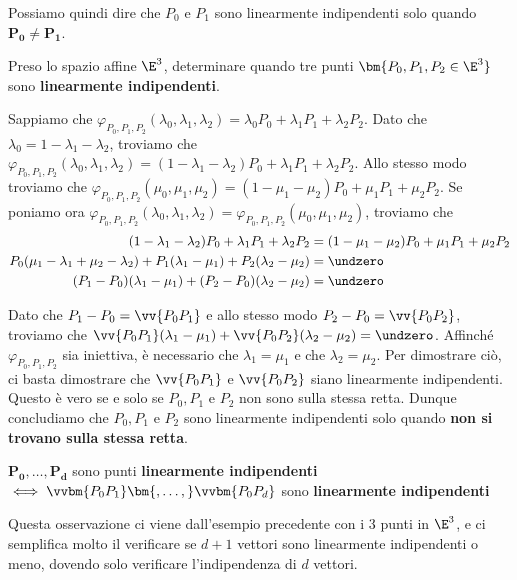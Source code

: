 \documentclass[11pt, a4paper, titlepage, oneside]{scrbook}
\begin{document}
Possiamo quindi dire che $P_0$ e $P_1$ sono linearmente indipendenti solo quando $\bm{P_0 \neq P_1}$.

\Separatore

Preso lo spazio affine $\E^3$, determinare quando tre punti $\bm{P_0,P_1,P_2 \in \E^3}$ sono \textbf{linearmente indipendenti}. \nopagebreak

Sappiamo che $\varphi_{P_0,P_1,P_2}(\lambda_0,\lambda_1,\lambda_2) = \lambda_0 P_0 + \lambda_1 P_1 + \lambda_2 P_2$. Dato che $\lambda_0 = 1 - \lambda_1 - \lambda_2$, troviamo che $\varphi_{P_0,P_1,P_2}(\lambda_0,\lambda_1,\lambda_2) = (1-\lambda_1-\lambda_2)P_0 + \lambda_1 P_1 + \lambda_2 P_2$. Allo stesso modo troviamo che $\varphi_{P_0,P_1,P_2}(\mu_0,\mu_1,\mu_2) = (1-\mu_1-\mu_2) P_0 + \mu_1 P_1 + \mu_2 P_2$. Se poniamo ora $\varphi_{P_0,P_1,P_2}(\lambda_0,\lambda_1,\lambda_2) = \varphi_{P_0,P_1,P_2}(\mu_0,\mu_1,\mu_2)$, troviamo che 
\begin{align*}
(1-\lambda_1 - \lambda_2)P_0 + \lambda_1 P_1 + \lambda_2 P_2 &= (1-\mu_1-\mu_2) P_0 + \mu_1 P_1 + \mu_2 P_2 \\
P_0(\mu_1 - \lambda_1 + \mu_2 - \lambda_2) + P_1(\lambda_1 - \mu_1) + P_2(\lambda_2 - \mu_2) &= \undzero \\
(P_1 - P_0)(\lambda_1 - \mu_1) + (P_2 - P_0)(\lambda_2 - \mu_2) &= \undzero 
\end{align*}

Dato che $P_1 - P_0 = \vv{P_0P_1}$ e allo stesso modo $P_2 - P_0 = \vv{P_0P_2}$, troviamo che \mbox{$\vv{P_0P_1}(\lambda_1 - \mu_1) + \vv{P_0P_2}(\lambda_2 - \mu_2) = \undzero$}. Affinché $\varphi_{P_0,P_1,P_2}$ sia iniettiva, è necessario che $\lambda_1 = \mu_1$ e che $\lambda_2 = \mu_2$. Per dimostrare ciò, ci basta dimostrare che $\vv{P_0P_1}$ e $\vv{P_0P_2}$ siano linearmente indipendenti. Questo è vero se e solo se $P_0,P_1$ e $P_2$ non sono sulla stessa retta. Dunque concludiamo che $P_0,P_1$ e $P_2$ sono linearmente indipendenti solo quando \textbf{non si trovano sulla stessa retta}.

\begin{Osservazione}[]
\label{oss-punti-indipendenti}
$\bm{P_0,\ldots,P_d}$ sono punti \textbf{linearmente indipendenti} $\iff \vvbm{P_0P_1}\bm{, \ldots, }\vvbm{P_0P_d}$ sono \textbf{linearmente indipendenti}
\end{Osservazione}

Questa osservazione ci viene dall'esempio precedente con i 3 punti in $\E^3$, e ci semplifica molto il verificare se $d+1$ vettori sono linearmente indipendenti o meno, dovendo solo verificare l'indipendenza di $d$ vettori.
\end{document}
